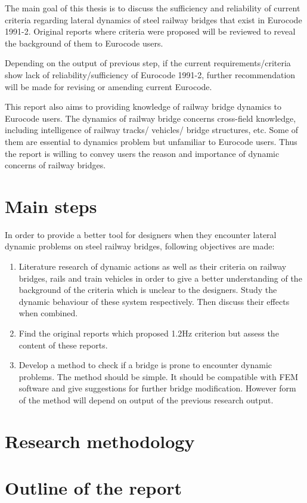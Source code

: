 

The main goal of this thesis is to discuss the sufficiency and reliability of current criteria regarding lateral dynamics of steel railway bridges that exist in Eurocode 1991-2. Original reports where criteria were proposed will be reviewed to reveal the background of them to Eurocode users. 

Depending on the output of previous step, if the current requirements/criteria show lack of reliability/sufficiency of Eurocode 1991-2, further recommendation will be made for revising or amending current Eurocode.

This report also aims to providing knowledge of railway bridge dynamics to Eurocode users. The dynamics of railway bridge concerns cross-field knowledge, including intelligence of railway tracks/ vehicles/ bridge structures, etc. Some of them are essential to dynamics problem but unfamiliar to Eurocode users. Thus the report is willing to convey users the reason and importance of dynamic concerns of railway bridges.



\section{Main steps}

In order to provide a better tool for designers when they encounter lateral dynamic problems on steel railway bridges, following objectives are made:

\begin{enumerate}

\item Literature research of dynamic actions as well as their criteria on railway bridges, rails and train vehicles in order to give a better understanding of the background of the criteria which is unclear to the designers. Study the dynamic behaviour of these system respectively. Then discuss their effects when combined.

\item Find the original reports which proposed 1.2Hz criterion but assess the content of these reports.

\item Develop a method to check if a bridge is prone to encounter dynamic problems. The method should be simple. It should be compatible with FEM software and give suggestions for further bridge modification. However form of the method will depend on output of the previous research output.
 

\end{enumerate}

\section{Research methodology}
\section{Outline of the report}

